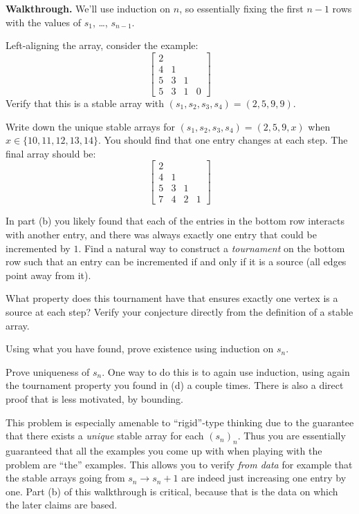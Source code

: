 \documentclass[11pt]{scrartcl}
\providecommand{\ii}{\item}
\newenvironment{walkthrough}{\noindent\textbf{\color{green!40!black}Walkthrough.}}{}
\begin{document}
\begin{walkthrough}
We'll use induction on $n$, so essentially fixing the first $n-1$ rows
with the values of $s_1$, \dots, $s_{n-1}$.
\begin{walk}
  \ii Left-aligning the array, consider the example:
  \[
  \begin{bmatrix}
    2 \\
    4 & 1 \\
    5 & 3 & 1 \\
    5 & 3 & 1 & 0
  \end{bmatrix}
  \]
  Verify that this is a stable array with
  $(s_1, s_2, s_3, s_4) = (2,5,9,9)$.
  \ii Write down the unique stable arrays
  for $(s_1, s_2, s_3, s_4) = (2,5,9,x)$
  when $x \in \{10, 11, 12, 13, 14\}$.
  You should find that one entry changes at each step.
  The final array should be:
  \[
  \begin{bmatrix}
    2 \\
    4 & 1 \\
    5 & 3 & 1 \\
    7 & 4 & 2 & 1
  \end{bmatrix}
  \]
  \ii In part (b) you likely found that
  each of the entries in the bottom row interacts
  with another entry,
  and there was always exactly one entry that could be incremented by $1$.
  Find a natural way to construct a \emph{tournament}
  on the bottom row such that an entry can be incremented
  if and only if it is a source (all edges point away from it).
  \ii What property does this tournament have
  that ensures exactly one vertex is a source at each step?
  Verify your conjecture directly from the definition of a stable array.
  \ii Using what you have found,
  prove existence using induction on $s_n$.
  \ii Prove uniqueness of $s_n$.
  One way to do this is to again use induction,
  using again the tournament property you found in (d) a couple times.
  There is also a direct proof that is less motivated, by bounding.
\end{walk}
This problem is especially amenable to ``rigid''-type thinking due
to the guarantee that there exists a \emph{unique} stable array for each $(s_n)_n$.
Thus you are essentially guaranteed that all the examples you
come up with when playing with the problem are ``the'' examples.
This allows you to verify \emph{from data} for example
that the stable arrays going from $s_n \to s_n + 1$
are indeed just increasing one entry by one.
Part (b) of this walkthrough is critical,
because that is the data on which the later claims are based.
\end{walkthrough}
\end{document}
